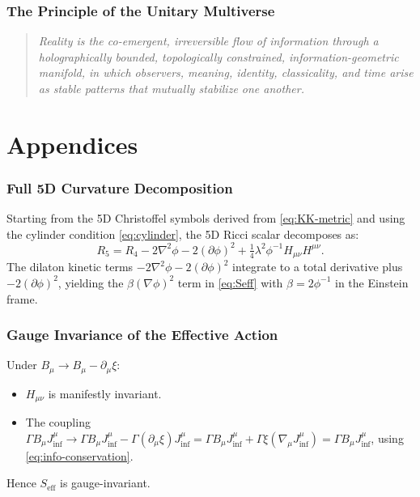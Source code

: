 \documentclass[12pt,a4paper]{article}
\newcommand{\lam}{\lambda}         %
\newcommand{\Seff}{S_{\text{eff}}} %
\begin{document}
\section{The Principle of the Unitary Multiverse}
\label{sec:principle}

\begin{quote}
  \textit{Reality is the co-emergent, irreversible flow of information through a
  holographically bounded, topologically constrained, information-geometric
  manifold, in which observers, meaning, identity, classicality, and time arise
  as stable patterns that mutually stabilize one another.}
\end{quote}

\part*{Appendices}

\appendix

\section{Full 5D Curvature Decomposition}
\label{app:curvature}

Starting from the 5D Christoffel symbols derived from \eqref{eq:KK-metric} and
using the cylinder condition \eqref{eq:cylinder}, the 5D Ricci scalar
decomposes as:
\begin{equation}
  R_5 = R_4 - 2\nabla^2\phi - 2(\partial\phi)^2
        + \tfrac{1}{4}\lam^2\phi^{-1} H_{\mu\nu}H^{\mu\nu} .
  \label{app:eq:R5}
\end{equation}
The dilaton kinetic terms $-2\nabla^2\phi - 2(\partial\phi)^2$ integrate to a
total derivative plus $-2(\partial\phi)^2$, yielding the $\beta(\nabla\phi)^2$
term in \eqref{eq:Seff} with $\beta = 2\phi^{-1}$ in the Einstein frame.

\section{Gauge Invariance of the Effective Action}
\label{app:gauge}

Under $B_\mu \to B_\mu - \partial_\mu\xi$:
\begin{itemize}
  \item $H_{\mu\nu}$ is manifestly invariant.
  \item The coupling $\Gamma B_\mu J_{\inf}^\mu \to \Gamma B_\mu J_{\inf}^\mu
        - \Gamma (\partial_\mu\xi) J_{\inf}^\mu = \Gamma B_\mu J_{\inf}^\mu
        + \Gamma\xi(\nabla_\mu J_{\inf}^\mu) = \Gamma B_\mu J_{\inf}^\mu$,
        using \eqref{eq:info-conservation}.
\end{itemize}
Hence $\Seff$ is gauge-invariant.
\end{document}

